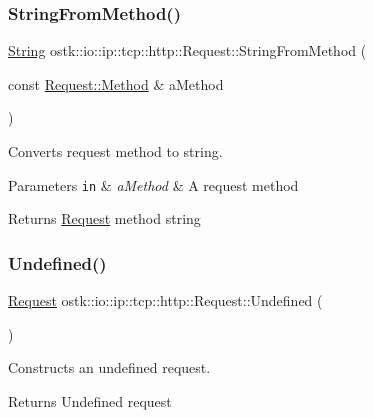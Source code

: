 \subsubsection{\texorpdfstring{String\+From\+Method()}{StringFromMethod()}}
{\footnotesize\ttfamily \hyperlink{namespaceostk_1_1io_1_1ip_1_1tcp_1_1http_a88a1b82fb01d02df64ca01ef4058bbef}{String} ostk\+::io\+::ip\+::tcp\+::http\+::\+Request\+::\+String\+From\+Method (\begin{DoxyParamCaption}\item[{const \hyperlink{classostk_1_1io_1_1ip_1_1tcp_1_1http_1_1_request_a07a40d81f4a6fb8443c80afc11571dd3}{Request\+::\+Method} \&}]{a\+Method }\end{DoxyParamCaption})\hspace{0.3cm}{\ttfamily [static]}}



Converts request method to string. 


\begin{DoxyParams}[1]{Parameters}
\mbox{\tt in}  & {\em a\+Method} & A request method \\
\hline
\end{DoxyParams}
\begin{DoxyReturn}{Returns}
\hyperlink{classostk_1_1io_1_1ip_1_1tcp_1_1http_1_1_request}{Request} method string 
\end{DoxyReturn}
\mbox{\label{classostk_1_1io_1_1ip_1_1tcp_1_1http_1_1_request_a6364c734464bdc1244ef9de16df1ee0c}} 
\subsubsection{\texorpdfstring{Undefined()}{Undefined()}}
{\footnotesize\ttfamily \hyperlink{classostk_1_1io_1_1ip_1_1tcp_1_1http_1_1_request}{Request} ostk\+::io\+::ip\+::tcp\+::http\+::\+Request\+::\+Undefined (\begin{DoxyParamCaption}{ }\end{DoxyParamCaption})\hspace{0.3cm}{\ttfamily [static]}}



Constructs an undefined request. 

\begin{DoxyReturn}{Returns}
Undefined request 
\end{DoxyReturn}


